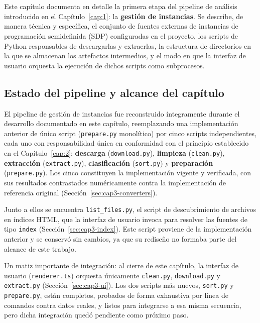 \chapter{}
\label{cap:3}

Este cap\'itulo documenta en detalle la primera etapa del pipeline de
an\'alisis introducido en el Cap\'itulo~\ref{cap:1}: la \textbf{gesti\'on de
instancias}. Se describe, de manera t\'ecnica y espec\'ifica, el conjunto de
fuentes externas de instancias de programaci\'on semidefinida (SDP)
configuradas en el proyecto, los scripts de Python responsables de
descargarlas y extraerlas, la estructura de directorios en la que se
almacenan los artefactos intermedios, y el modo en que la interfaz de
usuario orquesta la ejecuci\'on de dichos scripts como subprocesos.

\section{Estado del pipeline y alcance del cap\'itulo}
\label{sec:cap3-alcance}

El pipeline de gesti\'on de instancias fue reconstruido \'integramente
durante el desarrollo documentado en este cap\'itulo, reemplazando una
implementaci\'on anterior de \'unico script (\texttt{prepare.py} monol\'itico)
por cinco scripts independientes, cada uno con responsabilidad \'unica en
conformidad con el principio establecido en el Cap\'itulo~\ref{cap:2}:
\textbf{descarga} (\texttt{download.py}), \textbf{limpieza}
(\texttt{clean.py}), \textbf{extracci\'on} (\texttt{extract.py}),
\textbf{clasificaci\'on} (\texttt{sort.py}) y \textbf{preparaci\'on}
(\texttt{prepare.py}). Los cinco constituyen la implementaci\'on vigente y
verificada, con sus resultados contrastados num\'ericamente contra la
implementaci\'on de referencia original (Secci\'on~\ref{sec:cap3-converters}).

Junto a ellos se encuentra \texttt{list\_files.py}, el script de
descubrimiento de archivos en \'indices HTML, que la interfaz de usuario
invoca para resolver las fuentes de tipo \texttt{index}
(Secci\'on~\ref{sec:cap3-index}). Este script proviene de la implementaci\'on
anterior y se conserv\'o sin cambios, ya que su redise\~no no formaba parte
del alcance de este trabajo.

Un matiz importante de integraci\'on: al cierre de este cap\'itulo, la
interfaz de usuario (\texttt{renderer.ts}) orquesta \'unicamente
\texttt{clean.py}, \texttt{download.py} y \texttt{extract.py}
(Secci\'on~\ref{sec:cap3-ui}). Los dos scripts m\'as nuevos,
\texttt{sort.py} y \texttt{prepare.py}, est\'an completos, probados de forma
exhaustiva por l\'inea de comandos contra datos reales, y listos para
integrarse a esa misma secuencia, pero dicha integraci\'on qued\'o pendiente
como pr\'oximo paso.

